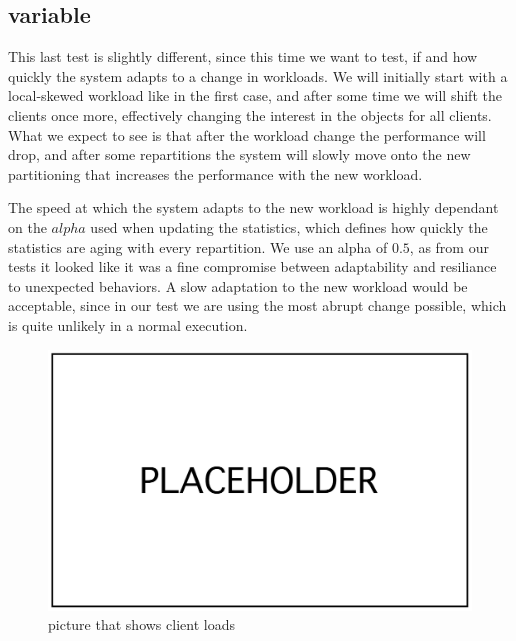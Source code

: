 \subsection{variable}\label{sec:variable}
This last test is slightly different, since this time we want to test, if and how quickly the system adapts to a change in workloads. We will initially start with a local-skewed workload like in the first case, and after some time we will shift the clients once more, effectively changing the interest in the objects for all clients. What we expect to see is that after the workload change the performance will drop, and after some repartitions the system will slowly move onto the new partitioning that increases the performance with the new workload.

The speed at which the system adapts to the new workload is highly dependant on the $alpha$ used when updating the statistics, which defines how quickly the statistics are aging with every repartition. We use an alpha of $0.5$, as from our tests it looked like it was a fine compromise between adaptability and resiliance to unexpected behaviors. A slow adaptation to the new workload would be acceptable, since in our test we are using the most abrupt change possible, which is quite unlikely in a normal execution.

\begin{figure}[!htb]
  \centering
  \includegraphics[width=\textwidth,height=\textheight,keepaspectratio]{img/placeholder.png}
  \caption[caption]{ picture that shows client loads }
  \label{fig:variable-loads}
\end{figure}

